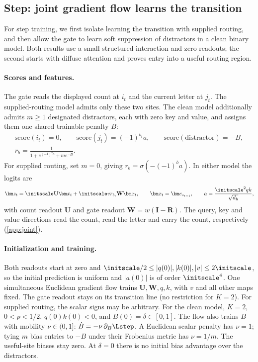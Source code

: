 \subsection{Step: joint gradient flow learns the transition}
\label{sec:step}
For step training, we first isolate learning the transition with supplied routing, and then allow the gate to learn
soft suppression of distractors in a clean binary model. Both results use a small structured interaction and zero readouts;
the second starts with diffuse attention and proves entry into a useful routing region.

\paragraph{Scores and features.} The gate reads the displayed count at $i_t$ and the current letter at $j_t$.
The supplied-routing model admits only these two sites. The clean model additionally admits $m\ge1$ designated distractors,
each with zero key and value, and assigns them one shared trainable penalty $B$:
\begin{equation}
 \begin{gathered}
 \mathrm{score}(i_t)=0,\qquad \mathrm{score}(j_t)=(-1)^{b_t}a,\qquad
 \mathrm{score}(\text{distractor})=-B,\\
 r_b=\frac{1}{1+e^{(-1)^ba}+me^{-B}}.
 \end{gathered}
 \label{eq:J-clean-scores}
\end{equation}
For supplied routing, set $m=0$, giving $r_b=\sigma(-(-1)^ba)$. In either model the logits are
\[
 \bm z_t=\initscale\mathbf U\bm x_t+\initscale v r_{b_t}\mathbf W\bm x_t,
 \qquad \bm x_t=\bm e_{s_{t-1}},\qquad a=\frac{\initscale^2qk}{\sqrt{d_{\mathrm h}}},
\]
with count readout $\mathbf U$ and gate readout $\mathbf W=w(\mathbf I-\mathbf R)$.
The query, key and value directions read the count, read the letter and carry the count, respectively
(\cref{app:joint}).

\paragraph{Initialization and training.} Both readouts start at zero and
$\initscale/2\le |q(0)|,|k(0)|,|v|\le2\initscale$, so the initial prediction is uniform and
$|a(0)|$ is of order $\initscale^4$. One simultaneous Euclidean gradient flow trains $\mathbf U,\mathbf W,q,k$,
with $v$ and all other maps fixed. The gate readout stays on its transition line (no restriction for $K=2$).
For supplied routing, the scalar signs may be arbitrary. For the clean model, $K=2$, $0<p<1/2$,
$q(0)k(0)<0$, and $B(0)=\delta\in[0,1]$. The flow also trains $B$ with mobility $\nu\in(0,1]$:
$\dot B=-\nu\,\partial_B\Lstep$. A Euclidean scalar penalty has $\nu=1$;
tying $m$ bias entries to $-B$ under their Frobenius metric has $\nu=1/m$.
The useful-site biases stay zero. At $\delta=0$ there is no initial bias advantage over the distractors.

